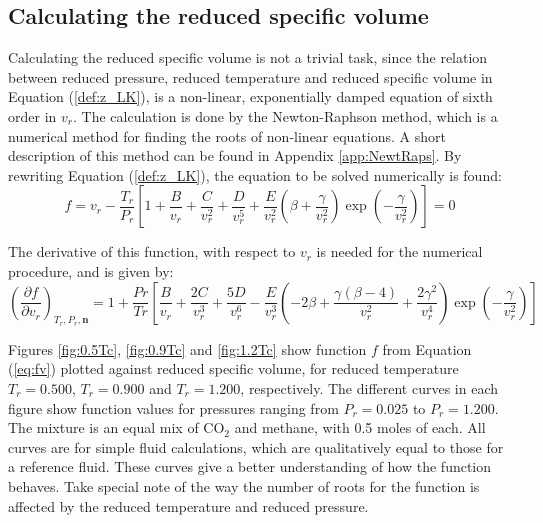 \documentclass[internal,english]{sintefmemo2012}
\numberwithin{equation}{section}
\newcommand*{\pder}[2]{\left(\frac{\partial #1}{\partial #2}\right)}
\newcommand*{\reff}[1]{(\ref{#1})}
\begin{document}
\subsection{Calculating the reduced specific volume}
\label{subsec:v_r}
Calculating the reduced specific volume is not a trivial task, since the relation between reduced pressure, reduced temperature and reduced specific volume in Equation \reff{def:z_LK}, is a non-linear, exponentially damped equation of sixth order in $v_r$. The calculation is done by the Newton-Raphson method, which is a numerical method for finding the roots of non-linear equations. A short description of this method can be found in Appendix \ref{app:NewtRaps}. By rewriting Equation \reff{def:z_LK}, the equation to be solved numerically is found:
\begin{equation}
\label{eq:fv}
f = v_r - \frac{T_r}{P_r} \left[1 + \frac{B}{v_r} + \frac{C}{v_r^2} + \frac{D}{v_r^5} + \frac{E}{v_r^2} \left( \beta + \frac{\gamma}{v_r^2} \right) \exp{\left(-\frac{\gamma}{v_r^2}\right)} \right] = 0
\end{equation}

The derivative of this function, with respect to $v_r$ is needed for the numerical procedure, and is given by:
\begin{equation}
\label{eq:fv_vr}
\pder{f}{v_r}_{T_r,P_r, \textbf{n}} = 1 + \frac{Pr}{Tr} \left[ \frac{B}{v_r} + \frac{2C}{v_r^3} + \frac{5D}{v_r^6} - \frac{E}{v_r^3}  \left(-2 \beta + \frac{\gamma (\beta - 4)}{v_r^2} + \frac{2 \gamma^2}{v_r^4} \right) \exp \left(- \frac{\gamma}{v_r^2} \right) \right]
\end{equation}

Figures \ref{fig:0.5Tc}, \ref{fig:0.9Tc} and \ref{fig:1.2Tc} show function $f$ from Equation \reff{eq:fv} plotted against reduced specific volume, for reduced temperature $T_r = 0.500$, $T_r = 0.900$ and $T_r = 1.200$, respectively. The different curves in each figure show function values for pressures ranging from $P_r = 0.025$ to $P_r = 1.200$. The mixture is an equal mix of CO$_2$ and methane, with 0.5 moles of each. All curves are for simple fluid calculations, which are qualitatively equal to those for a reference fluid. These curves give a better understanding of how the function behaves. Take special note of the way the number of roots for the function is affected by the reduced temperature and reduced pressure.
\end{document}
